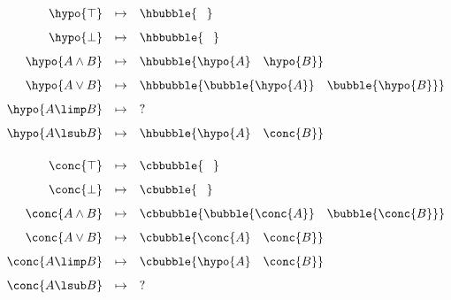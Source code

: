 $$
\begin{array}{r@{\quad\mapsto\quad}l@{\vspace{0.75em}}}
  \hypo{\top} & \hbubble{\phantom{\top}} \\
  \hypo{\bot} & \hbbubble{\phantom{\bot}} \\
  \hypo{A \land B} & \hbubble{\hypo{A}~~~\hypo{B}} \\
  \hypo{A \lor B} & \hbbubble{\bubble{\hypo{A}}~~~\bubble{\hypo{B}}} \\
  \hypo{A \limp B} & ? \\
  \hypo{A \lsub B} & \hbubble{\hypo{A}~~~\conc{B}} \\
\end{array}
$$
$$
\begin{array}{r@{\quad\mapsto\quad}l@{\vspace{0.75em}}}
  \conc{\top} & \cbbubble{\phantom{\top}} \\
  \conc{\bot} & \cbubble{\phantom{\bot}} \\
  \conc{A \land B} & \cbbubble{\bubble{\conc{A}}~~~\bubble{\conc{B}}} \\
  \conc{A \lor B} & \cbubble{\conc{A}~~~\conc{B}} \\
  \conc{A \limp B} & \cbubble{\hypo{A}~~~\conc{B}} \\
  \conc{A \lsub B} & ?
\end{array}
$$